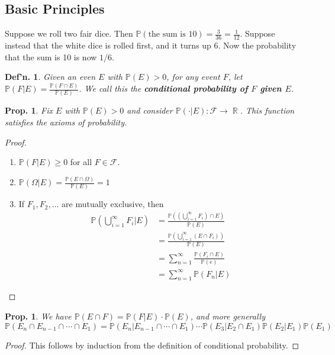 \documentclass[12pt, a4paper]{book}
\DeclareMathOperator{\R}{\mathbb{R}}
\renewcommand{\Pr}{\mathbb{P}}
\newtheorem{definition}[theorem]{Def'n.}
\newtheorem{proposition}[theorem]{Prop.}
\theoremstyle{nonumberplain}
\newtheorem{proof}{Proof}
\begin{document}
\subsection{Basic Principles}
Suppose we roll two fair dice.
Then $\Pr(\text{the sum is 10})=\frac{3}{36}=\frac{1}{12}$.
Suppose instead that the white dice is rolled first, and it turns up $6$.
Now the probability that the sum is 10 is now $1/6$.
\begin{definition}
    Given an even $E$ with $\Pr(E)>0$, for any event $F$, let $\Pr(F|E)=\frac{\Pr(F\cap E)}{\Pr(E)}$.
    We call this the \textbf{conditional probability of $F$ given $E$}.
\end{definition}
\begin{proposition}
    Fix $E$ with $\Pr(E)>0$ and consider $\Pr(\cdot|E):\mathcal{F}\to\R$.
    This function satisfies the axioms of probability.
\end{proposition}
\begin{proof}
    \begin{enumerate}
        \item $\Pr(F|E)\geq0$ for all $F\in\mathcal{F}$.
        \item $\Pr(\Omega|E)=\frac{\Pr(E\cap\Omega)}{\Pr(E)}=1$
        \item If $F_1,F_2,\ldots$ are mutually exclusive, then
            \begin{align*}
                \Pr\left(\bigcup\limits_{i=1}^\infty F_i|E\right) &= \frac{\Pr( (\bigcup_{i=1}^\infty F_i)\cap E)}{\Pr(E)}\\
                                                      &= \frac{\Pr(\bigcup_{i=1}^\infty(E\cap F_i))}{\Pr(E)}\\
                                                      &= \sum\limits_{n=1}^\infty\frac{\Pr(F_i\cap E)}{\Pr(e)}\\
                                                      &= \sum\limits_{n=1}^\infty\Pr(F_n|E)
            \end{align*}
    \end{enumerate}
\end{proof}
\begin{proposition}
    We have $\Pr(E\cap F)=\Pr(F|E)\cdot \Pr(E)$, and more generally
    \[\Pr(E_n\cap E_{n-1}\cap\cdots\cap E_1)=\Pr(E_n|E_{n-1}\cap\cdots\cap E_1)\cdots\Pr(E_3|E_2\cap E_1)\Pr(E_2|E_1)\Pr(E_1)\]
\end{proposition}
\begin{proof}
    This follows by induction from the definition of conditional probability.
\end{proof}
\end{document}
